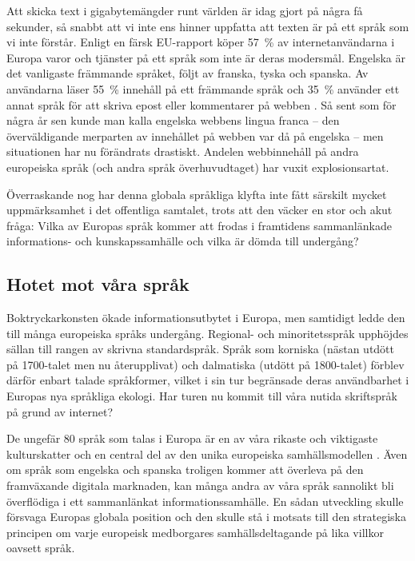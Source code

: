 \begin{multicols}{2}
Att skicka text i gigabytemängder runt världen är idag gjort på några
få sekunder, så snabbt att vi inte ens hinner uppfatta att texten är
på ett språk som vi inte förstår. Enligt en färsk EU-rapport köper
57~\% av internet\-an\-vänd\-ar\-na i Europa varor och tjänster på ett
språk som inte är deras modersmål. Engelska är det vanligaste
främmande språket, följt av franska, tyska och spanska. Av användarna
läser 55~\% innehåll på ett främmande språk och 35~\% använder ett
annat språk för att skriva epost eller kommentarer på webben \cite{EC1}. Så sent
som för några år sen kunde man kalla engelska webbens lingua franca --
den överväldigande merparten av innehållet på webben var då på
engelska -- men situationen har nu förändrats drastiskt. Andelen
webbinnehåll på andra europeiska språk (och andra språk
överhuvudtaget) har vuxit explosionsartat.

Överraskande nog har denna globala språkliga klyfta inte fått särskilt
mycket uppmärksamhet i det offentliga samtalet, trots att den väcker
en stor och akut fråga: Vilka av Europas språk kommer att frodas i
framtidens samman\-länkade informa\-tions- och kun\-skaps\-sam\-hälle
och vilka är dömda till undergång?

\subsection{Hotet mot våra språk}

Boktryckarkonsten ökade informations\-ut\-bytet i Europa, men
sam\-tidigt ledde den till många europeiska språks
under\-gång. Regional- och minoritets\-språk upphöjdes sällan till
rangen av skrivna standard\-språk. Språk som korniska (nästan utdött
på 1700-talet men nu återupplivat) och dalmatiska (utdött på 1800-talet) förblev därför
enbart talade språkformer, vilket i sin tur begränsade deras
användbarhet i Europas nya språkliga ekologi. Har turen nu kommit till
våra nutida skriftspråk på grund av internet?


De ungefär 80 språk som talas i Europa är en av våra rikaste och
viktigaste kulturskatter och en central del av den unika europeiska
samhällsmodellen \cite{EC2}. Även om språk som engelska och spanska troligen
kommer att överleva på den framväxande digitala marknaden, kan många
andra av våra språk sannolikt bli överflödiga i ett samman\-länkat
informa\-tions\-samhälle. En sådan utveckling skulle försvaga Europas
globala position och den skulle stå i motsats till den strategiska
principen om varje europeisk medborgares samhällsdeltagande på lika
villkor oavsett språk.


\end{multicols}
